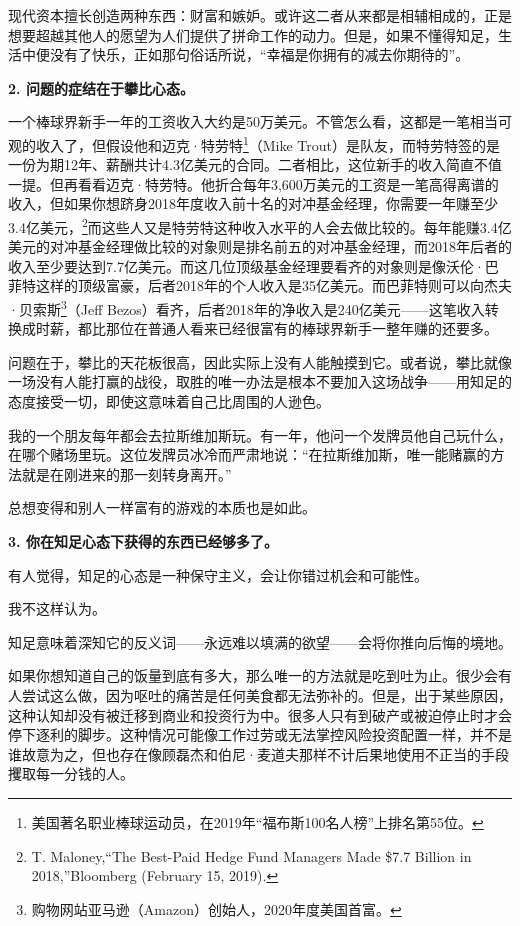 现代资本擅长创造两种东西：财富和嫉妒。或许这二者从来都是相辅相成的，正是想要超越其他人的愿望为人们提供了拼命工作的动力。但是，如果不懂得知足，生活中便没有了快乐，正如那句俗话所说，“幸福是你拥有的减去你期待的”。

\textbf{2. 问题的症结在于攀比心态。}

一个棒球界新手一年的工资收入大约是50万美元。不管怎么看，这都是一笔相当可观的收入了，但假设他和迈克·特劳特\footnote{美国著名职业棒球运动员，在2019年“福布斯100名人榜”上排名第55位。}（Mike Trout）是队友，而特劳特签的是一份为期12年、薪酬共计4.3亿美元的合同。二者相比，这位新手的收入简直不值一提。但再看看迈克·特劳特。他折合每年3,600万美元的工资是一笔高得离谱的收入，但如果你想跻身2018年度收入前十名的对冲基金经理，你需要一年赚至少3.4亿美元，\footnote{T. Maloney,“The Best-Paid Hedge Fund Managers Made \$7.7 Billion in 2018,”Bloomberg (February 15, 2019).}而这些人又是特劳特这种收入水平的人会去做比较的。每年能赚3.4亿美元的对冲基金经理做比较的对象则是排名前五的对冲基金经理，而2018年后者的收入至少要达到7.7亿美元。而这几位顶级基金经理要看齐的对象则是像沃伦·巴菲特这样的顶级富豪，后者2018年的个人收入是35亿美元。而巴菲特则可以向杰夫·贝索斯\footnote{购物网站亚马逊（Amazon）创始人，2020年度美国首富。}（Jeff Bezos）看齐，后者2018年的净收入是240亿美元——这笔收入转换成时薪，都比那位在普通人看来已经很富有的棒球界新手一整年赚的还要多。

问题在于，攀比的天花板很高，因此实际上没有人能触摸到它。或者说，攀比就像一场没有人能打赢的战役，取胜的唯一办法是根本不要加入这场战争——用知足的态度接受一切，即使这意味着自己比周围的人逊色。

我的一个朋友每年都会去拉斯维加斯玩。有一年，他问一个发牌员他自己玩什么，在哪个赌场里玩。这位发牌员冰冷而严肃地说：“在拉斯维加斯，唯一能赌赢的方法就是在刚进来的那一刻转身离开。”

总想变得和别人一样富有的游戏的本质也是如此。

\textbf{3. 你在知足心态下获得的东西已经够多了。}

有人觉得，知足的心态是一种保守主义，会让你错过机会和可能性。

我不这样认为。

知足意味着深知它的反义词——永远难以填满的欲望——会将你推向后悔的境地。

如果你想知道自己的饭量到底有多大，那么唯一的方法就是吃到吐为止。很少会有人尝试这么做，因为呕吐的痛苦是任何美食都无法弥补的。但是，出于某些原因，这种认知却没有被迁移到商业和投资行为中。很多人只有到破产或被迫停止时才会停下逐利的脚步。这种情况可能像工作过劳或无法掌控风险投资配置一样，并不是谁故意为之，但也存在像顾磊杰和伯尼·麦道夫那样不计后果地使用不正当的手段攫取每一分钱的人。

